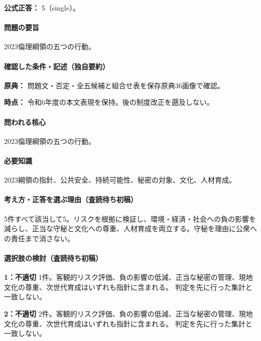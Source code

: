 \textbf{公式正答：} 5（single）。

\paragraph{問題の要旨} 2023倫理綱領の五つの行動。

\paragraph{確認した条件・記述（独自要約）}\mbox{}\par

\noindent\textbf{原典：} 問題文・否定・全五候補と組合せ表を保存原典36画像で確認。\par

\noindent\textbf{時点：} 令和6年度の本文表現を保持。後の制度改正を遡及しない。\par

\paragraph{問われる核心} 2023倫理綱領の五つの行動。

\paragraph{必要知識} 2023綱領の指針、公共安全、持続可能性、秘密の対象、文化、人材育成。

\paragraph{考え方・正答を選ぶ理由（査読待ち初稿）} 5件すべて該当して5。リスクを根拠に検証し、環境・経済・社会への負の影響を減らし、正当な守秘と文化への尊重、人材育成を両立する。守秘を理由に公衆への責任まで消さない。

\paragraph{選択肢の検討（査読待ち初稿）}\mbox{}\par

\noindent\textbf{1：不適切} 1件。客観的リスク評価、負の影響の低減、正当な秘密の管理、現地文化の尊重、次世代育成はいずれも指針に含まれる。 判定を先に行った集計と一致しない。\par

\noindent\textbf{2：不適切} 2件。客観的リスク評価、負の影響の低減、正当な秘密の管理、現地文化の尊重、次世代育成はいずれも指針に含まれる。 判定を先に行った集計と一致しない。\par

